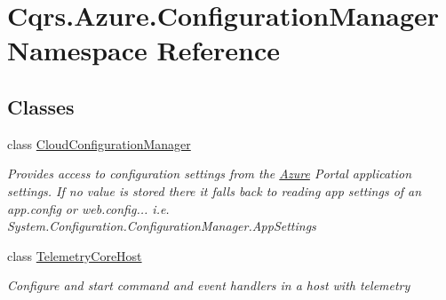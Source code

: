 \hypertarget{namespaceCqrs_1_1Azure_1_1ConfigurationManager}{}\section{Cqrs.\+Azure.\+Configuration\+Manager Namespace Reference}
\label{namespaceCqrs_1_1Azure_1_1ConfigurationManager}
\subsection*{Classes}
\begin{DoxyCompactItemize}
\item 
class \hyperlink{classCqrs_1_1Azure_1_1ConfigurationManager_1_1CloudConfigurationManager}{Cloud\+Configuration\+Manager}
\begin{DoxyCompactList}\small\item\em Provides access to configuration settings from the \hyperlink{namespaceCqrs_1_1Azure}{Azure} Portal application settings. If no value is stored there it falls back to reading app settings of an app.\+config or web.\+config... i.\+e. System.\+Configuration.\+Configuration\+Manager.\+App\+Settings \end{DoxyCompactList}\item 
class \hyperlink{classCqrs_1_1Azure_1_1ConfigurationManager_1_1TelemetryCoreHost}{Telemetry\+Core\+Host}
\begin{DoxyCompactList}\small\item\em Configure and start command and event handlers in a host with telemetry \end{DoxyCompactList}\end{DoxyCompactItemize}
